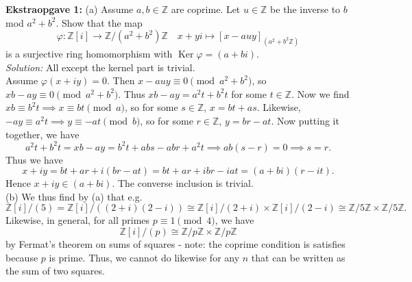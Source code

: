 \documentclass[a4paper]{article}
\DeclareMathOperator{\Ker}{Ker}
\begin{document}
\textbf{Ekstraopgave 1:} (a) Assume $a,b \in \mathbb{Z}$ are coprime. Let $u
\in \mathbb{Z}$ be the inverse to $b$ mod $a^2 + b^2$. Show that the map
\[
    \varphi  \colon \mathbb{Z}[i] \to \mathbb{Z}/ \left( a^2 + b^2 \right) \mathbb{Z}
    \quad x+yi \mapsto \left[ x-auy \right]_{\left( a^2 + b^2 \mathbb{Z} \right) }
\] 
is a surjective ring homomorphism with $\Ker \varphi = (a+bi)$.\\
\linebreak
\textit{Solution:} All except the kernel part is trivial.\\
Assume $\varphi (x+iy) = 0$. Then
$x - auy \equiv 0 \pmod{a^2 + b^2}$, so $
xb - ay \equiv 0 \pmod{a^2 + b^2}$. Thus
$xb - ay = a^2 t + b^2 t$ for some $t \in \mathbb{Z}$.
Now we find
$xb \equiv b^2 t \implies x \equiv bt \pmod{a}$, so for some $s \in
\mathbb{Z}$,
$x = bt + as$. Likewise, $-ay \equiv a^2 t \implies y \equiv -at \pmod{b}$, so
for some $r \in \mathbb{Z}$, $y = br - at$. Now putting it together, we have
\[
a^2 t + b^2 t = xb - ay = b^2 t + abs - abr + a^2 t \implies ab (s-r)
= 0 \implies s=r.
\] 
Thus we have
\[
x + iy = bt +ar + i (br - at) = bt +ar + ibr - iat
= (a+bi) (r - it).
\] 
Hence $x + iy \in (a+bi)$. The converse inclusion is trivial.\\
\linebreak
(b) We thus find by (a) that e.g.
\[
    \mathbb{Z}[i]/(5) = \mathbb{Z}[i] / ( (2+i)(2-i))
    \cong \mathbb{Z}[i] /(2+i) \times \mathbb{Z}[i]/(2-i)
    \cong \mathbb{Z}/5\mathbb{Z} \times \mathbb{Z}/5\mathbb{Z}.
\] 
Likewise, in general, for all primes $p \equiv 1 \pmod{4}$, we have
\[
    \mathbb{Z}[i]/(p) \cong \mathbb{Z}/p\mathbb{Z} \times \mathbb{Z}/p\mathbb{Z}
\] 
by Fermat's theorem on sums of squares - note: the coprime condition is
satisfies because $p$ is prime. Thus, we cannot do likewise for any $n$ that
can be written as the sum of two squares.
\end{document}
